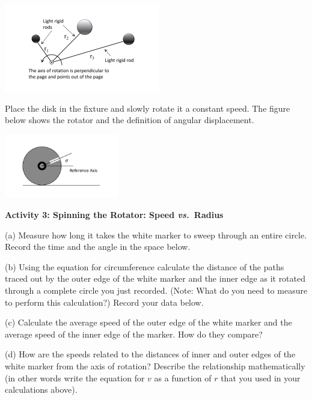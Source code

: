 \vspace{0.3cm}
{\par\centering \includegraphics[height=1.5in]{rotation/rotation_fig5_new.pdf} \par}
\vspace{0.3cm}

Place the disk in the fixture and slowly rotate it a constant speed. The figure
below shows the rotator and the definition of angular displacement.

\vspace{0.3cm}
{\par\centering \includegraphics[height=1.1in]{rotation/rotation_fig6_new.pdf} \par}
\vspace{0.3cm}

\textbf{Activity 3: Spinning the Rotator: Speed \textit{vs.}~Radius} 

(a) Measure how long it takes the white marker to sweep through an entire circle.
Record the time and the angle in the space below.
\answerspace{10mm}

(b) Using the equation for circumference calculate the distance of the paths traced out by 
the outer edge of the white marker and the inner edge as it rotated through a complete circle you just recorded.
(Note: What do you need to measure to perform this calculation?) Record your
data below.
\answerspace{15mm}

(c) Calculate the average speed of the outer edge of the white marker and the
average speed of the inner edge of the marker. How do they compare?
\answerspace{20mm}

(d) How are the speeds related to the distances of inner and
outer edges of the white marker from the axis of rotation? Describe the
relationship mathematically (in other words write the equation for $v$ as a function of $r$ that you used in your calculations above).
\answerspace{15mm}

